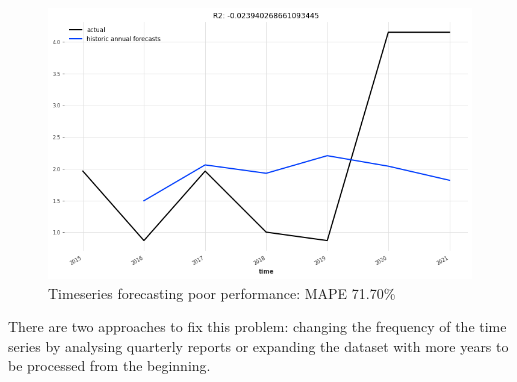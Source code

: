 \documentclass[12pt,MSc,a4paper,oneside]{muthesis}
\begin{document}
    \begin{figure}[h]
      \centering
      \includegraphics[scale=0.3]{timeseries_went_wrong.png}
      \caption{Timeseries forecasting poor performance: MAPE 71.70\%}
    \end{figure}

    There are two approaches to fix this problem: changing the frequency of the time series by analysing quarterly reports or expanding the dataset with more years to be processed from the beginning.
\end{document}
